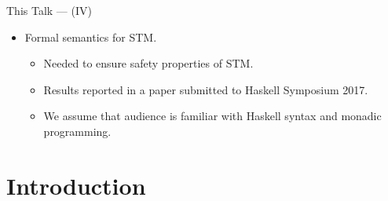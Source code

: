 \documentclass[14pt]{beamer}
\begin{document}
     \begin{frame}{This Talk --- (IV)}
        \begin{itemize}
           \item Formal semantics for STM.
           \begin{itemize}
              \item Needed to ensure safety properties of STM.
              \item Results reported in a paper submitted to Haskell Symposium 2017.
              \item We assume that audience is familiar with Haskell syntax and
                    monadic programming. 
           \end{itemize}
        \end{itemize}
     \end{frame}
     \section{Introduction}
\end{document}
